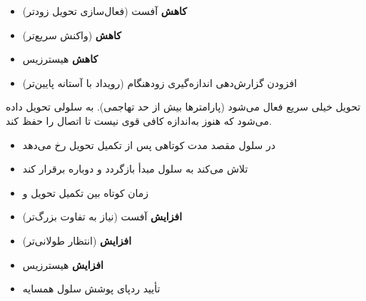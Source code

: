 
\begin{itemize}
\tightlist
\item
  \textbf{کاهش} آفست  (فعال‌سازی تحویل زودتر)
\item
  \textbf{کاهش}  (واکنش سریع‌تر)
\item
  \textbf{کاهش} هیسترزیس
\item
  افزودن گزارش‌دهی اندازه‌گیری زودهنگام (رویداد  با آستانه پایین‌تر)
\end{itemize}



\CNchained{}

تحویل خیلی سریع فعال می‌شود (پارامترها بیش از حد تهاجمی).  به سلولی تحویل داده می‌شود که هنوز به‌اندازه کافی قوی نیست تا اتصال را حفظ کند.





\begin{itemize}
\tightlist
\item
   در سلول مقصد مدت کوتاهی پس از تکمیل تحویل رخ می‌دهد
\item
   تلاش می‌کند به سلول مبدأ بازگردد و دوباره برقرار کند
\item
  زمان کوتاه بین تکمیل تحویل و 
\end{itemize}


\begin{itemize}
\tightlist
\item
  \textbf{افزایش} آفست  (نیاز به تفاوت بزرگ‌تر)
\item
  \textbf{افزایش}  (انتظار طولانی‌تر)
\item
  \textbf{افزایش} هیسترزیس
\item
  تأیید ردپای پوشش سلول همسایه
\end{itemize}



